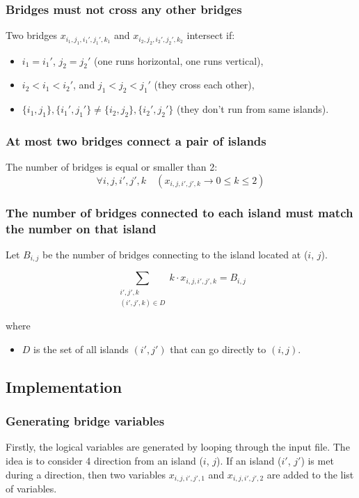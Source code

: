 \documentclass[12pt, a4paper]{article}
\begin{document}
\subsubsection{Bridges must not cross any other bridges}
Two bridges $x_{i_1,j_1,i_1',j_1',k_1}$ and $x_{i_2,j_2,i_2',j_2',k_2}$ intersect if:

\begin{itemize}
  \item $i_1 = i_1'$, $j_2 = j_2'$ (one runs horizontal, one runs vertical),
  \item $i_2 < i_1 < i_2'$, and $j_1 < j_2 < j_1'$ (they cross each other),
  \item $\{i_1,j_1\}, \{i_1',j_1'\} \ne \{i_2,j_2\}, \{i_2',j_2'\}$ (they don't run from same islands).
\end{itemize}
\subsubsection{At most two bridges connect a pair of islands}
The number of bridges is equal or smaller than 2:
\[
    \forall i, j, i', j', k \quad ( x_{i,j,i',j',k} \rightarrow 0 \leq k \leq 2)
    \]
\subsubsection{The number of bridges connected to each island must match the number on that island}
Let $B_{i,j}$ be the number of bridges connecting to the island located at ($i$, $j$).

\[
\sum_{\substack{i',j',k \\ (i',j',k) \in D}} k \cdot x_{i,j,i',j',k} = B_{i,j}
\]

where 
\begin{itemize}
    \item $D$ is the set of all islands $(i',j')$ that can go directly to $(i,j)$.
\end{itemize}
\subsection{Implementation}
\subsubsection{Generating bridge variables}
Firstly, the logical variables are generated by looping through the input file. The idea is to consider 4 direction from an island ($i$, $j$). If an island ($i'$, $j'$) is met during a direction, then two variables $x_{i,j,i',j',1}$ and $x_{i,j,i',j',2}$ are added to the list of variables.
\end{document}

